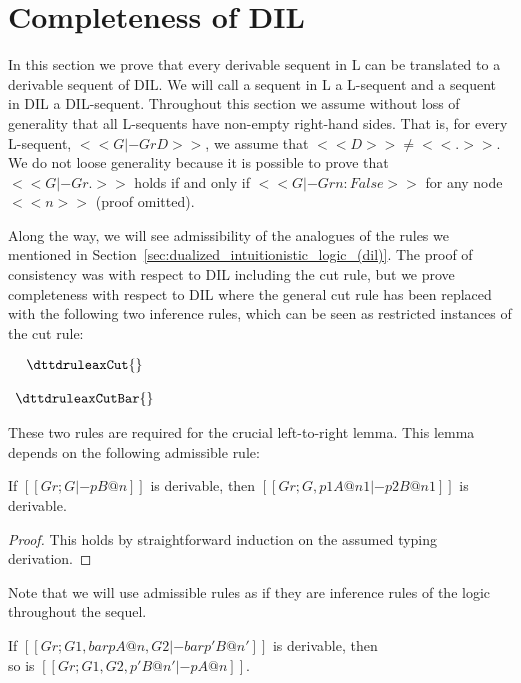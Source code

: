 \section{Completeness of DIL}
\label{sec:completeness}
In this section we prove that every derivable sequent in L can be
translated to a derivable sequent of DIL.  We will call a sequent in L
a L-sequent and a sequent in DIL a DIL-sequent. Throughout this
section we assume without loss of generality that all L-sequents have
non-empty right-hand sides.  That is, for every L-sequent, 
$<<G |- Gr D>>$, we assume that $<<D>> \not= <<.>>$.  We do not loose generality
because it is possible to prove that $<<G |- Gr .>>$ holds if and only
if $<<G |- Gr n : False>>$ for any node $<<n>>$ (proof omitted).

Along the way, we will see admissibility of the analogues of the rules
we mentioned in Section~\ref{sec:dualized_intuitionistic_logic_(dil)}.
The proof of consistency was with respect to DIL including the cut
rule, but we prove completeness with respect to DIL where the general
cut rule has been replaced with the following two inference rules,
which can be seen as restricted instances of the cut rule:
\begin{center}
  \footnotesize
  \begin{math}
    \begin{array}{c}
      \dttdruleaxCut{} \\
      \\
      \dttdruleaxCutBar{}
    \end{array}
  \end{math}
\end{center}
  These two rules are required for the crucial left-to-right lemma.
  This lemma depends on the following admissible rule:
  \begin{lemma}[Weakening]
    \label{lemma:weakening}
    If $[[Gr ; G |- p B @ n]]$ is derivable, then $[[Gr ; G, p1 A @ n1 |- p2 B @
    n1]]$ is derivable.
  \end{lemma}
    \begin{proof}
      This holds by straightforward induction on the assumed typing
      derivation.    
    \end{proof}
Note that we will use admissible rules as if they are inference rules
of the logic throughout the sequel.
\begin{lemma}
  \label{lemma:refocus}
  If $[[Gr ; G1 , bar p A @ n , G2 |- bar p' B @ n']]$ is derivable, then \\
  so is $[[Gr ; G1 , G2 , p' B @ n' |- p A @ n]]$.  
\end{lemma}
